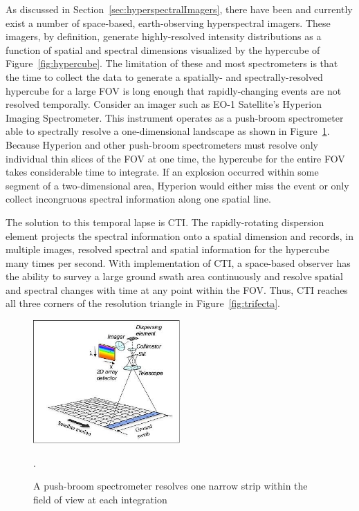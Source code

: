 As discussed in Section~\ref{sec:hyperspectralImagers}, there have been and currently exist a number of space-based, earth-observing hyperspectral imagers. These imagers, by definition, generate highly-resolved intensity distributions as a function of spatial and spectral dimensions visualized by the hypercube of Figure~\ref{fig:hypercube}. The limitation of these and most spectrometers is that the time to collect the data to generate a spatially- and spectrally-resolved hypercube for a large \ac{FOV} is long enough that rapidly-changing events are not resolved temporally. Consider an imager such as EO-1 Satellite's Hyperion Imaging Spectrometer. This instrument operates as a push-broom spectrometer able to spectrally resolve a one-dimensional landscape as shown in Figure~\ref{fig:pushbroomOperation}. Because Hyperion and other push-broom spectrometers must resolve only individual thin slices of the \ac{FOV} at one time, the hypercube for the entire \ac{FOV} takes considerable time to integrate. If an explosion occurred within some segment of a two-dimensional area, Hyperion would either miss the event or only collect incongruous spectral information along one spatial line. 

 The solution to this temporal lapse is \ac{CTI}. The rapidly-rotating dispersion element projects the spectral information onto a spatial dimension and records, in multiple images, resolved spectral and spatial information for the hypercube many times per second. With implementation of \ac{CTI}, a space-based observer has the ability to survey a large ground swath area continuously and resolve spatial and spectral changes with time at any point within the \ac{FOV}. Thus, \ac{CTI} reaches all three corners of the resolution triangle in Figure~\ref{fig:trifecta}.
 
 \begin{figure}[htb]		%
\centering
\includegraphics[width=0.5\textwidth,trim=0.25cm 0.25cm 0.25cm 0.25cm,clip]{images/chap1/pushbroomOperation}
\caption{A push-broom spectrometer resolves one narrow strip within the field of view at each integration~\cite{AVIRIS}}.
\label{fig:pushbroomOperation}
\end{figure}

